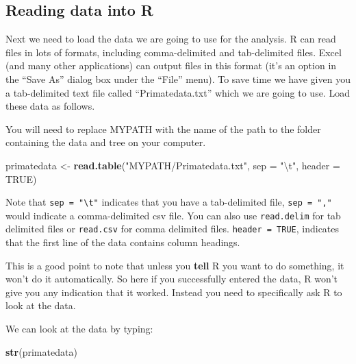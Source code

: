 \documentclass[11pt]{article}
\newcommand{\KeywordTok}[1]{\textcolor[rgb]{0.13,0.29,0.53}{\textbf{{#1}}}}
\newcommand{\DataTypeTok}[1]{\textcolor[rgb]{0.13,0.29,0.53}{{#1}}}
\newcommand{\CharTok}[1]{\textcolor[rgb]{0.31,0.60,0.02}{{#1}}}
\newcommand{\StringTok}[1]{\textcolor[rgb]{0.31,0.60,0.02}{{#1}}}
\newcommand{\OtherTok}[1]{\textcolor[rgb]{0.56,0.35,0.01}{{#1}}}
\newcommand{\NormalTok}[1]{{#1}}
\begin{document}
\subsection{Reading data into R}
\label{reading}
Next we need to load the data we are going to use for the analysis. R
can read files in lots of formats, including comma-delimited and
tab-delimited files. Excel (and many other applications) can output
files in this format (it's an option in the ``Save As'' dialog box
under the ``File'' menu). To save time we have given you a tab-delimited
text file called ``Primatedata.txt'' which we are going to use. Load
these data as follows. 

\begin{framed}
You will need to replace MYPATH with the name of the path to the folder 
containing the data and tree on your computer.
\end{framed}

\begin{snugshade}
\begin{Highlighting}[]
\NormalTok{primatedata <-}\StringTok{ }\KeywordTok{read.table}\NormalTok{(}\StringTok{"MYPATH/Primatedata.txt"}\NormalTok{, }\DataTypeTok{sep =} \StringTok{"}\CharTok{\textbackslash{}t}\StringTok{"}\NormalTok{, }
                          \DataTypeTok{header =} \OtherTok{TRUE}\NormalTok{)}
\end{Highlighting}
\end{snugshade}

Note that \texttt{sep = "\textbackslash{}t"} indicates that you have a tab-delimited file, 
\texttt{sep = ","}  would indicate a comma-delimited csv file. You can also use
\texttt{read.delim} for tab delimited files or \texttt{read.csv} for comma delimited
files. \texttt{header = TRUE}, indicates that the first line of the data contains
column headings.

This is a good point to note that unless you \textbf{tell} R you want to
do something, it won't do it automatically. So here if you successfully
entered the data, R won't give you any indication that it worked.
Instead you need to specifically ask R to look at the data.

We can look at the data by typing:

\begin{snugshade}
\begin{Highlighting}[]
\KeywordTok{str}\NormalTok{(primatedata)}
\end{Highlighting}
\end{snugshade}
\end{document}

